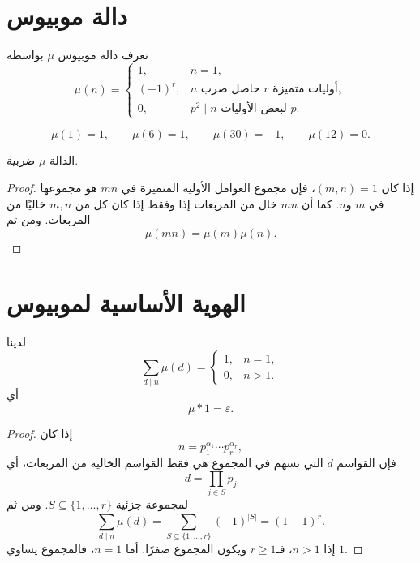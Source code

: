\section{دالة موبيوس}

\begin{definition}
تعرف دالة موبيوس \(\mu\) بواسطة
\[
\mu(n)=
\begin{cases}
1,&n=1,\\
(-1)^r,&n \text{ حاصل ضرب } r \text{ أوليات متميزة},\\
0,&p^2\mid n \text{ لبعض الأوليات }p.
\end{cases}
\]
\end{definition}

\begin{example}
\[
\mu(1)=1,\qquad
\mu(6)=1,\qquad
\mu(30)=-1,\qquad
\mu(12)=0.
\]
\end{example}

\begin{proposition}
\label{prop:mobius-multiplicative}
\provedhere
الدالة \(\mu\) ضربية.
\end{proposition}

\begin{proof}
إذا كان \((m,n)=1\)، فإن مجموع العوامل الأولية المتميزة في \(mn\) هو مجموعها في \(m\) و\(n\). كما أن \(mn\) خال من المربعات إذا وفقط إذا كان كل من \(m,n\) خاليًا من المربعات. ومن ثم
\[
\mu(mn)=\mu(m)\mu(n).
\]
\end{proof}

\section{الهوية الأساسية لموبيوس}

\begin{theorem}
\label{thm:mobius-basic-identity}
\provedhere
لدينا
\[
\sum_{d\mid n}\mu(d)
=
\begin{cases}
1,&n=1,\\
0,&n>1.
\end{cases}
\]
أي
\[
\mu*1=\varepsilon.
\]
\end{theorem}

\begin{proof}
إذا كان
\[
n=p_1^{\alpha_1}\cdots p_r^{\alpha_r},
\]
فإن القواسم \(d\) التي تسهم في المجموع هي فقط القواسم الخالية من المربعات، أي
\[
d=\prod_{j\in S}p_j
\]
لمجموعة جزئية \(S\subseteq\{1,\dots,r\}\). ومن ثم
\[
\sum_{d\mid n}\mu(d)
=
\sum_{S\subseteq\{1,\dots,r\}}(-1)^{|S|}
=
(1-1)^r.
\]
إذا \(n>1\)، فـ\(r\geq1\) ويكون المجموع صفرًا. أما \(n=1\)، فالمجموع يساوي \(1\).
\end{proof}


